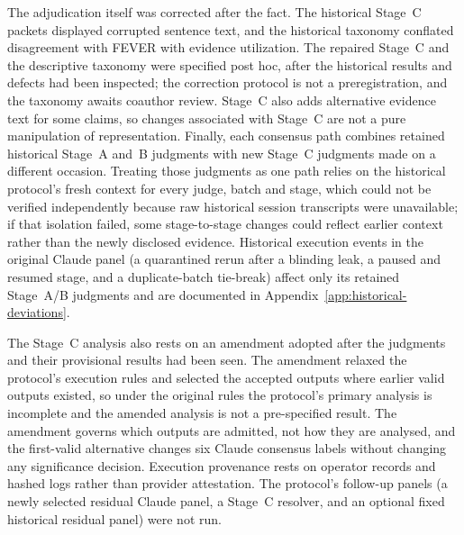 The adjudication itself was corrected after the fact.
The historical Stage~C packets displayed corrupted sentence text, and the historical taxonomy conflated disagreement with FEVER with evidence utilization.
The repaired Stage~C and the descriptive taxonomy were specified post hoc, after the historical results and defects had been inspected; the correction protocol is not a preregistration, and the taxonomy awaits coauthor review.
Stage~C also adds alternative evidence text for some claims, so changes associated with Stage~C are not a pure manipulation of representation.
Finally, each consensus path combines retained historical Stage~A and~B judgments with new Stage~C judgments made on a different occasion.
Treating those judgments as one path relies on the historical protocol's fresh context for every judge, batch and stage, which could not be verified independently because raw historical session transcripts were unavailable; if that isolation failed, some stage-to-stage changes could reflect earlier context rather than the newly disclosed evidence.
Historical execution events in the original Claude panel (a quarantined rerun after a blinding leak, a paused and resumed stage, and a duplicate-batch tie-break) affect only its retained Stage~A/B judgments and are documented in Appendix~\ref{app:historical-deviations}.

The Stage~C analysis also rests on an amendment adopted after the judgments and their provisional results had been seen.
The amendment relaxed the protocol's execution rules and selected the accepted outputs where earlier valid outputs existed, so under the original rules the protocol's primary analysis is incomplete and the amended analysis is not a pre-specified result.
The amendment governs which outputs are admitted, not how they are analysed, and the first-valid alternative changes six Claude consensus labels without changing any significance decision.
Execution provenance rests on operator records and hashed logs rather than provider attestation.
The protocol's follow-up panels (a newly selected residual Claude panel, a Stage~C resolver, and an optional fixed historical residual panel) were not run.
